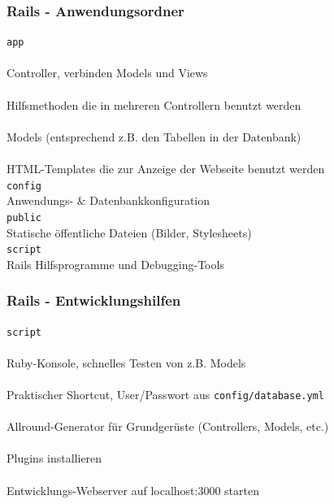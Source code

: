 \begin{frame}
  \frametitle{Rails - Anwendungsordner}
  \pause
  \small
  {\tt app} \\
   \\ \enskip\enskip Controller, verbinden Models und Views \\
   \\ \enskip\enskip Hilfsmethoden die in mehreren Controllern benutzt werden \\
   \\ \enskip\enskip Models (entsprechend z.B. den Tabellen in der Datenbank) \\
   \\ \enskip\enskip HTML-Templates die zur Anzeige der Webseite benutzt werden \\
  {\tt config} \\ \enskip\enskip Anwendungs- \& Datenbankkonfiguration \\
  {\tt public} \\ \enskip\enskip Statische öffentliche Dateien (Bilder, Stylesheets) \\
  {\tt script} \\ \enskip\enskip Rails Hilfsprogramme und Debugging-Tools \\
\end{frame}

\begin{frame}
  \frametitle{Rails - Entwicklungshilfen}
  \pause
  \small
  {\tt script} \\
   \\ \enskip\enskip Ruby-Konsole, schnelles Testen von z.B. Models\\
   \\ \enskip\enskip Praktischer Shortcut, User/Passwort aus {\tt config/database.yml} \\
   \\ \enskip\enskip Allround-Generator für Grundgerüste (Controllers, Models, etc.) \\
   \\ \enskip\enskip Plugins installieren \\
   \\ \enskip\enskip Entwicklungs-Webserver auf localhost:3000 starten
\end{frame}

